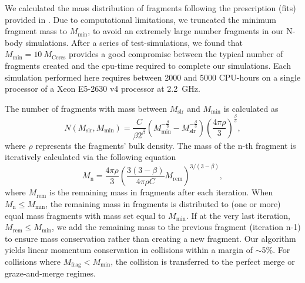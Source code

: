 \documentclass[fleqn,usenatbib]{mnras}
\begin{document}
\begin{table*}
\end{table*}

We calculated the mass distribution of fragments following the prescription (fits) provided in  \cite{leinhardt2012}. Due to computational limitations, we truncated the minimum fragment mass to $M_{\text{min}}$, to avoid an extremely large number fragments in our N-body simulations. After a series of test-simulations, we found that  $M_{\text{min}} = 10~M_{\text{Ceres}}$ provides a good compromise between the typical number of fragments created and the cpu-time required to complete our simulations.  Each simulation performed here requires between 2000 and 5000 CPU-hours on a single processor of a Xeon E5-2630 v4 processor at 2.2~GHz. 

The number of fragments with mass between $M_{\text{slr}}$ and $M_{\text{min}}$ is calculated as
\begin{equation}
N(M_{\text{slr}},M_{\text{min}}) = \frac{C}{\beta 2^{\beta }}\left ( M^{-\frac{\beta}{3} }_{\text{min}} -M^{-\frac{\beta}{3} }_{\text{slr}}\right )\left (\frac{4\pi \rho   }{3}\right )^{\frac{\beta}{3}},
\end{equation}
where $\rho$ represents the fragments' bulk density. The mass of the n-th fragment is iteratively calculated via the following equation
\begin{equation}
M_{\text{n}} = \frac{4\pi \rho }{3}\left (\frac{3(3-\beta )}{4\pi \rho C}M_{\text{rem}}  \right )^{3/(3-\beta )},
\label{eq:tailfrag}
\end{equation}
where $M_{\text{rem}}$ is the remaining mass in fragments after each iteration. When $M_{\text{n}} \leq M_{\text{min}}$, the remaining mass in fragments is distributed to (one or more) equal mass fragments with mass set equal to $M_{\text{min}}$. If at the very last  iteration, $M_{\text{rem}}\leq M_{\text{min}}$, we add the remaining mass to the previous fragment (iteration n-1) to ensure mass conservation rather than creating a new fragment. Our algorithm yields linear momentum conservation in collisions within a margin of $\sim$5\%. For collisions where $M_{\text{frag}} < M_{\text{min}}$, the collision is transferred to the perfect merge or graze-and-merge regimes.
\end{document}

